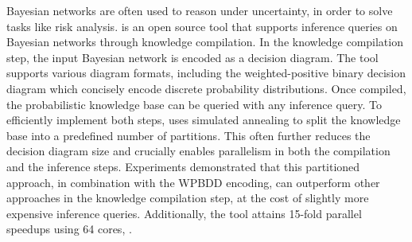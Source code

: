 
Bayesian networks are often used to reason under uncertainty,
in order to solve tasks like risk analysis. 
\toolname is an open source tool that supports inference queries on Bayesian networks through knowledge compilation. 
In the knowledge compilation step, the input Bayesian network is encoded as a decision diagram.  The tool supports various diagram formats, including the weighted-positive binary decision diagram which concisely encode discrete probability distributions.
Once compiled, the probabilistic knowledge base can be queried with any inference query.
To efficiently implement both steps, \toolname uses simulated annealing to split the knowledge base into a predefined number of partitions. This often further reduces the decision diagram size and crucially enables parallelism in both the compilation and the inference steps.
Experiments demonstrated that this partitioned approach, in combination with the WPBDD encoding, can outperform other approaches in the knowledge compilation step, at the cost of slightly more expensive inference queries.
Additionally, the tool attains 15-fold parallel speedups using 64 cores, .





